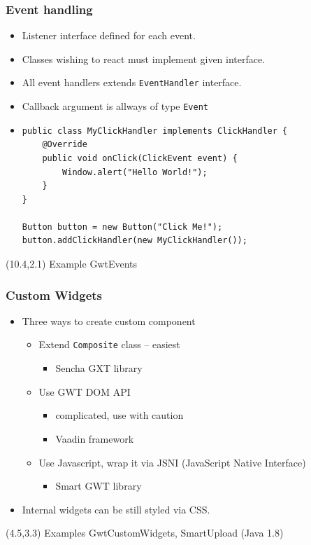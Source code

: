 \documentclass[10pt,table, xcolor=pdflatex]{beamer}
\begin{document}
\begin{frame}[fragile]\frametitle{Event handling}
	\begin{itemize}
		\item Listener interface defined for each event.
		\item Classes wishing to react must implement given interface.
		\item All event handlers extends \texttt{EventHandler} interface.
		\item Callback argument is allways of type \texttt{Event}
        \item[]
        	\lstset{language=Java, basicstyle=\footnotesize\ttfamily}
            \begin{lstlisting}
public class MyClickHandler implements ClickHandler {
    @Override
    public void onClick(ClickEvent event) {
        Window.alert("Hello World!");
    }
}

Button button = new Button("Click Me!");
button.addClickHandler(new MyClickHandler());
            \end{lstlisting}
	\end{itemize}
\begin{textblock}{15}(10.4,2.1)
    {\footnotesize Example GwtEvents}
\end{textblock}
\end{frame}


\begin{frame}\frametitle{Custom Widgets}
	\renewcommand{\baselinestretch}{1.2}
	\begin{itemize}
		\item Three ways to create custom component
          \begin{itemize}
        	\item Extend \texttt{Composite} class -- easiest
              \begin{itemize}
            	\item Sencha GXT library
              \end{itemize}
            \item Use GWT DOM API
              \begin{itemize}
                \item complicated, use with caution
                \item Vaadin framework
              \end{itemize}
            \item Use Javascript, wrap it via JSNI (JavaScript Native Interface)
              \begin{itemize}
            	\item Smart GWT library
              \end{itemize}
          \end{itemize}
		\item Internal widgets can be still styled via CSS.
	\end{itemize}
	\renewcommand{\baselinestretch}{1}
\begin{textblock}{15}(4.5,3.3)
    {\footnotesize Examples GwtCustomWidgets, SmartUpload (Java 1.8)}
\end{textblock}
\end{frame}
\end{document}
